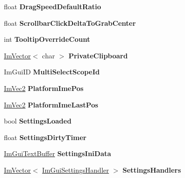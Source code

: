 \begin{DoxyCompactItemize}
\mbox{\label{structImGuiContext_aea2d961c03a1d0879088385d8cf602dd}} 
float {\bfseries Drag\+Speed\+Default\+Ratio}
\item 
\mbox{\label{structImGuiContext_a2922e36c1eed77cc0ec707e9771cf07a}} 
float {\bfseries Scrollbar\+Click\+Delta\+To\+Grab\+Center}
\item 
\mbox{\label{structImGuiContext_a1c6e3c1b866fa1abf473d3cd9eafce0f}} 
int {\bfseries Tooltip\+Override\+Count}
\item 
\mbox{\label{structImGuiContext_a4ba950183c7c5e401ca4113e09b1ced4}} 
\hyperlink{structImVector}{Im\+Vector}$<$ char $>$ {\bfseries Private\+Clipboard}
\item 
\mbox{\label{structImGuiContext_a8e0acb41c9f70c9b101618440c9739d3}} 
Im\+Gui\+ID {\bfseries Multi\+Select\+Scope\+Id}
\item 
\mbox{\label{structImGuiContext_ae4f302f7b3f8f3705a0b5a823817554a}} 
\hyperlink{structImVec2}{Im\+Vec2} {\bfseries Platform\+Ime\+Pos}
\item 
\mbox{\label{structImGuiContext_aa07a9810576b2ff576d5f5a3f121ce3f}} 
\hyperlink{structImVec2}{Im\+Vec2} {\bfseries Platform\+Ime\+Last\+Pos}
\item 
\mbox{\label{structImGuiContext_a1043af3ac30119c12c2e85923e1ec20b}} 
bool {\bfseries Settings\+Loaded}
\item 
\mbox{\label{structImGuiContext_a7e0dd3aef4a4f0fd85ed39e13824f2ab}} 
float {\bfseries Settings\+Dirty\+Timer}
\item 
\mbox{\label{structImGuiContext_a5b4bad72af7065aa7e57b32fedd5ea0e}} 
\hyperlink{structImGuiTextBuffer}{Im\+Gui\+Text\+Buffer} {\bfseries Settings\+Ini\+Data}
\item 
\mbox{\label{structImGuiContext_aded9a2cb80c805407734b8bf7d0ef515}} 
\hyperlink{structImVector}{Im\+Vector}$<$ \hyperlink{structImGuiSettingsHandler}{Im\+Gui\+Settings\+Handler} $>$ {\bfseries Settings\+Handlers}

\end{DoxyCompactItemize}
